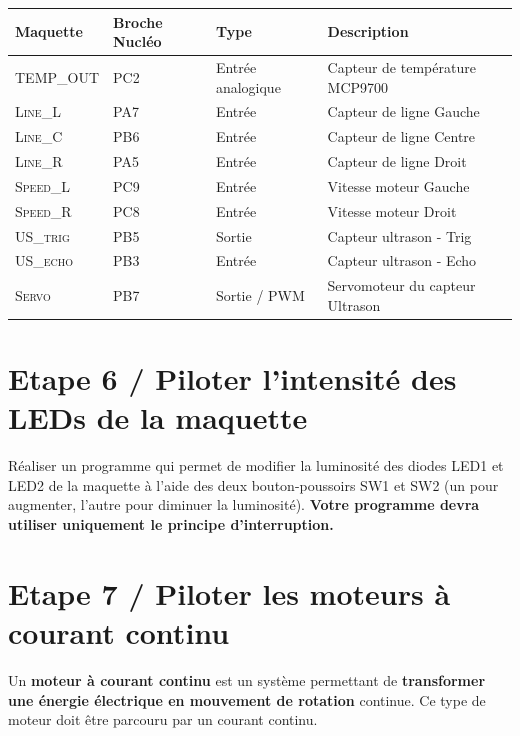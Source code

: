 \documentclass[a4paper,11pt,titlepage]{article} %
\begin{document}
\begin{center}
\begin{tabular}{|l|l|l|l|}
\hline 
Maquette & \textbf{Broche Nucléo} & Type & Description \\ 
\hline 
\textsc{TEMP\_OUT} & PC2 & Entrée analogique & Capteur de température MCP9700\\ 
\hline 
\textsc{Line\_L} & PA7 & Entrée & Capteur de ligne Gauche\\ 
\textsc{Line\_C} & PB6 & Entrée & Capteur de ligne Centre\\ 
\textsc{Line\_R} & PA5 & Entrée & Capteur de ligne Droit\\ 
\hline 
\textsc{Speed\_L} & PC9 & Entrée & Vitesse moteur Gauche\\ 
\textsc{Speed\_R} & PC8 & Entrée & Vitesse moteur Droit\\ 
\hline  
\textsc{US\_trig} & PB5 & Sortie & Capteur ultrason - Trig\\ 
\textsc{US\_echo} & PB3 & Entrée & Capteur ultrason - Echo\\ 
\textsc{Servo} & PB7 & Sortie / PWM & Servomoteur du capteur Ultrason\\ 
\hline  
\end{tabular} 
\end{center}




\section{Etape 6 / Piloter l'intensité des LEDs de la maquette}

\Manip Réaliser un programme qui permet de modifier la luminosité des diodes LED1 et LED2 de la maquette à l'aide des deux bouton-poussoirs SW1 et SW2 (un pour augmenter, l'autre pour diminuer la luminosité). \textbf{Votre programme devra utiliser uniquement le principe d'interruption.}


\newpage

\section{Etape 7 / Piloter les moteurs à courant continu}

Un \textbf{moteur à courant continu} est un système permettant de \textbf{transformer une énergie électrique en mouvement de rotation} continue. Ce type de moteur doit être parcouru par un courant continu.
\end{document}
